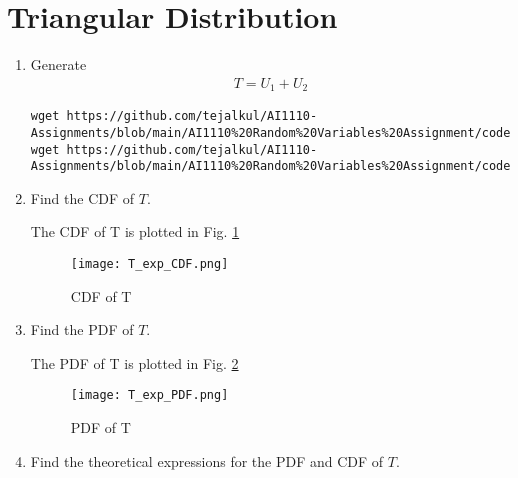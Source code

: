 \documentclass[journal,12pt,twocolumn]{IEEEtran}
\renewcommand\thesection{\arabic{section}}
\begin{document}
\section{Triangular Distribution}
\begin{enumerate}[label=\thesection.\arabic*
,ref=\thesection.\theenumi]
%
\item Generate 
	\begin{align}
		T = U_1+U_2
	\end{align}

\solution
\begin{lstlisting}
wget https://github.com/tejalkul/AI1110-Assignments/blob/main/AI1110%20Random%20Variables%20Assignment/codes/exrand.c
wget https://github.com/tejalkul/AI1110-Assignments/blob/main/AI1110%20Random%20Variables%20Assignment/codes/coeffs.h
\end{lstlisting}
\item Find the CDF of $T$.

\solution
The CDF of T is plotted in Fig. \ref{Fig:tria_exp_cdf} 
\begin{figure}[!ht]
\texttt{[image: T\_exp\_CDF.png]}
\caption{CDF of T}
\label{Fig:tria_exp_cdf}
\end{figure}
\item Find the PDF of $T$.

\solution
The PDF of T is plotted in Fig. \ref{Fig:tria_exp_pdf} 
\begin{figure}[!ht]
\texttt{[image: T\_exp\_PDF.png]}
\caption{PDF of T}
\label{Fig:tria_exp_pdf}
\end{figure} 
\item Find the theoretical expressions for the PDF and CDF of $T$.


\end{enumerate}
\end{document}
